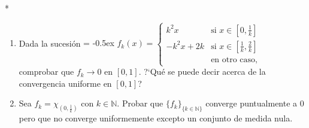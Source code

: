 \documentclass{book}
\newcommand{\nn}{\mathbb{N}}
\begin{document}
\begin{ejer} {}*
\begin{enumerate} 
\item Dada la sucesión
{
\extrarowheight = -0.5ex
\renewcommand{\arraystretch}{2.0}
$f_k(x)=\left\{
\begin{array}{cl}
k^2x &\mbox{si }x\in[0,\frac{1}{k}]
\\
-k^2x+2k &\mbox{si } x\in \left[\frac{1}{k},\frac{2}{k}\right] 
\\
&\mbox{en otro caso,}
\end{array}
\right.
$}\\
comprobar que $f_k \to 0$ en $[0,1]$. 
?`Qué se puede decir acerca de la convergencia uniforme en $[0,1]$?
\item Sea $f_k=\chi_{(0,\frac{1}{k})}$ con $k\in\nn$. 
Probar que $\{f_k\}_{\{k\in\nn\}}$ converge puntualmente a $0$ pero que no converge uniformemente
excepto un conjunto de medida nula.
\end{enumerate}
\end{ejer}



\end{document}
